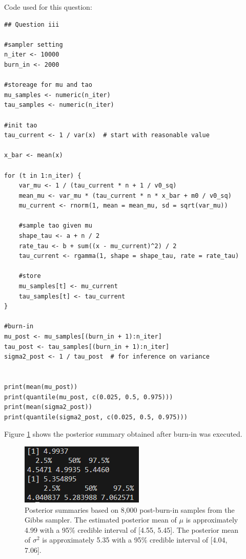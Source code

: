 \documentclass[]{article}
\begin{document}
Code used for this question:

\begin{lstlisting}
## Question iii

#sampler setting
n_iter <- 10000
burn_in <- 2000

#storeage for mu and tao 
mu_samples <- numeric(n_iter)
tau_samples <- numeric(n_iter)

#init tao
tau_current <- 1 / var(x)  # start with reasonable value

x_bar <- mean(x)

for (t in 1:n_iter) {
	var_mu <- 1 / (tau_current * n + 1 / v0_sq)
	mean_mu <- var_mu * (tau_current * n * x_bar + m0 / v0_sq)
	mu_current <- rnorm(1, mean = mean_mu, sd = sqrt(var_mu))
	
	#sample tao given mu
	shape_tau <- a + n / 2
	rate_tau <- b + sum((x - mu_current)^2) / 2
	tau_current <- rgamma(1, shape = shape_tau, rate = rate_tau)
	
	#store
	mu_samples[t] <- mu_current
	tau_samples[t] <- tau_current
}

#burn-in
mu_post <- mu_samples[(burn_in + 1):n_iter]
tau_post <- tau_samples[(burn_in + 1):n_iter]
sigma2_post <- 1 / tau_post  # for inference on variance


print(mean(mu_post))
print(quantile(mu_post, c(0.025, 0.5, 0.975)))
print(mean(sigma2_post))
print(quantile(sigma2_post, c(0.025, 0.5, 0.975)))
\end{lstlisting}


Figure \ref{fig:img-2-post-summary} shows the posterior summary obtained after burn-in was executed.


\begin{figure}
	\centering
	\includegraphics[width=0.7\linewidth]{img/img-2-post-summary}
	\caption{ Posterior summaries based on 8,000 post-burn-in samples from the Gibbs sampler. The estimated posterior mean of $\mu$ is approximately 4.99 with a 95\% credible interval of [4.55, 5.45]. The posterior mean of $\sigma^2$ is approximately 5.35 with a 95\% credible interval of [4.04, 7.06]. }
	\label{fig:img-2-post-summary}
\end{figure}
\end{document}
